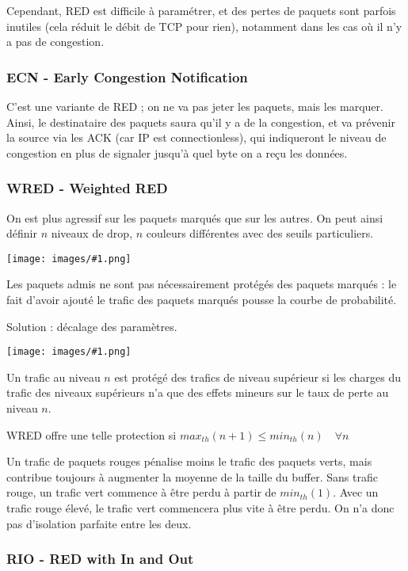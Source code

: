 \documentclass[10pt,a4paper]{report}
\newcommand{\dessin}[1]{\begin{center}\texttt{[image: images/\#1.png]}\end{center}}
\begin{document}
			Cependant, RED est difficile à paramétrer, et des pertes de paquets sont parfois inutiles (cela réduit le débit de TCP pour rien), notamment dans les cas où il n'y a pas de congestion.
			
			
			\subsubsection{ECN - Early Congestion Notification}
			
			C'est une variante de RED ; on ne va pas jeter les paquets, mais les marquer. Ainsi, le destinataire des paquets saura qu'il y a de la congestion, et va prévenir la source via les ACK (car IP est connectionless), qui indiqueront le niveau de congestion en plus de signaler jusqu'à quel byte on a reçu les données.
			
			\subsubsection{WRED - Weighted RED}
			
			On est plus agressif sur les paquets marqués que sur les autres. On peut ainsi définir $n$ niveaux de drop, $n$ couleurs différentes avec des seuils particuliers.
			
			\dessin{112}
			
			Les paquets admis ne sont pas nécessairement protégés des paquets marqués : le fait d'avoir ajouté le trafic des paquets marqués pousse la courbe de probabilité.
			
			Solution : décalage des paramètres.
			
			\dessin{113}
			
			Un trafic au niveau $n$ est protégé des trafics de niveau supérieur si les charges du trafic des niveaux supérieurs n'a que des effets mineurs sur le taux de perte au niveau $n$.
			
			WRED offre une telle protection si $max_{th}(n + 1) \leq min_{th}(n) \quad \forall n$
			
			Un trafic de paquets rouges pénalise moins le trafic des paquets verts, mais contribue toujours à augmenter la moyenne de la taille du buffer. Sans trafic rouge, un trafic vert commence à être perdu à partir de $min_{th}(1)$. Avec un trafic rouge élevé, le trafic vert commencera plus vite à être perdu. On n'a donc pas d'isolation parfaite entre les deux.
			
			\subsubsection{RIO - RED with In and Out}
			
\end{document}
